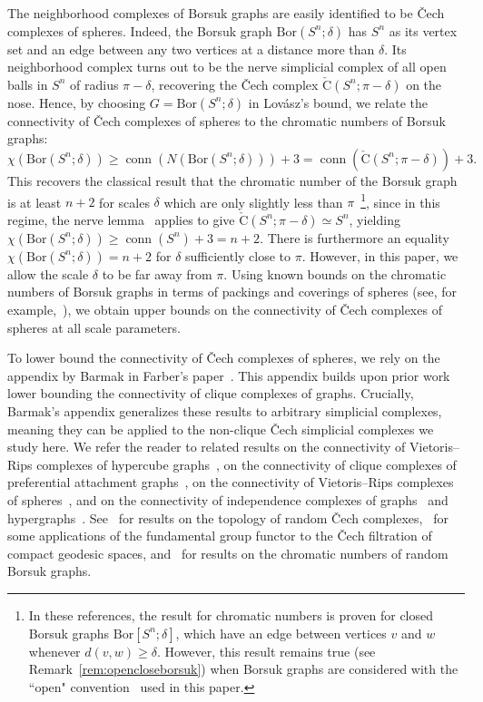 \documentclass[11 pt,a4paper,twoside,reqno]{amsart}
\theoremstyle{definition}
\newcommand{\cech}[2]{\mathrm{\check{C}}(#1;#2)}
\DeclareMathOperator{\conn}{conn}
\newcommand{\bor}[2]{\mathrm{Bor}(#1;#2)}
\newcommand{\cbor}[2]{\mathrm{Bor}[#1;#2]}
\begin{document}
The neighborhood complexes of Borsuk graphs are easily identified to be \v{C}ech complexes of spheres.
Indeed, the Borsuk graph $\bor{S^n}{\delta}$ has $S^n$ as its vertex set and an edge between any two vertices at a distance more than $\delta$.
Its neighborhood complex turns out to be the nerve simplicial complex of all open balls in $S^n$ of radius $\pi-\delta$, recovering the \v{C}ech complex $\cech{S^n}{\pi-\delta}$ on the nose.
Hence, by choosing $G=\bor{S^n}{\delta}$ in Lov{\'a}sz's bound, we relate the connectivity of \v{C}ech complexes of spheres to the chromatic numbers of Borsuk graphs:
\[
\chi(\bor{S^n}{\delta}) \ge \conn(N(\bor{S^n}{\delta}))+3 = \conn(\cech{S^n}{\pi-\delta})+3.
\]
This recovers the classical result that the chromatic number of the Borsuk graph is at least $n+2$ for scales $\delta$ which are only slightly less than $\pi$~\cite{lovasz1983self,raigorodskii2010chromatic,raigorodskii2012chromatic}\footnote{In these references, the result for chromatic numbers is proven for closed Borsuk graphs $\cbor{S^n}{\delta}$, which have an edge between vertices $v$ and $w$ whenever $d(v,w)\ge \delta$.
However, this result remains true (see Remark~\ref{rem:opencloseborsuk}) when Borsuk graphs are considered with the ``open" convention~\cite{erdos-hajnal1967} used in this paper.}, since in this regime, the nerve lemma~\cite{Borsuk1948,Hatcher} applies to give $\cech{S^n}{\pi-\delta}\simeq S^n$, yielding $\chi(\bor{S^n}{\delta}) \ge \conn(S^n)+3 = n+2$.
There is furthermore an equality $\chi(\bor{S^n}{\delta}) = n+2$ for $\delta$ sufficiently close to $\pi$.
However, in this paper, we allow the scale $\delta$ to be far away from $\pi$.
Using known bounds on the chromatic numbers of {Borsuk} graphs in terms of packings and coverings of spheres (see, for example,~\cite{MoyPhD}), we obtain upper bounds on the connectivity of \v{C}ech complexes of spheres at all scale parameters.

To lower bound the connectivity of \v{C}ech complexes of spheres, we rely on the appendix by Barmak in Farber's paper~\cite{farber2023large}.
This appendix builds upon prior work~\cite{meshulam2001clique,meshulam2003domination,chudnovsky2000systems,Kahle2009} lower bounding the connectivity of clique complexes of graphs.
Crucially, Barmak's appendix generalizes these results to arbitrary simplicial complexes, meaning they can be applied to the non-clique \v{C}ech simplicial complexes we study here.
We refer the reader to related results on the connectivity of Vietoris--Rips complexes of hypercube graphs~\cite{bendersky2023connectivity}, on the connectivity of clique complexes of preferential attachment graphs~\cite{siu2024topological}, on the connectivity of Vietoris--Rips complexes of spheres~\cite{ABV}, and on the connectivity of independence complexes of graphs~\cite{adamaszek2011lower} and hypergraphs~\cite{taylan2024bounds}.
See~\cite{bobrowski2017vanishing,bobrowski2022homological,bobrowski2019random,lim2026strange} for results on the topology of random \v{C}ech complexes,~\cite{virk20201} for some applications of the fundamental group functor to the \v{C}ech filtration of compact geodesic spaces, and~\cite{kahle2020chromatic} for results on the chromatic numbers of random Borsuk graphs. 
\end{document}
